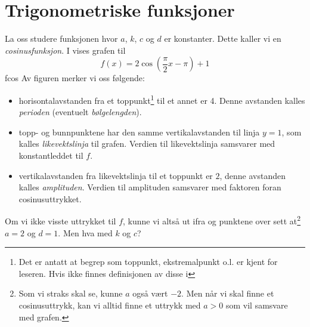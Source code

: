 \kvad
{}

\section{Trigonometriske funksjoner \label{trifunksjoner}}
La oss studere funksjonen
hvor $ a $, $ k $, $ c $ og $ d $ er konstanter. Dette kaller vi en \textit{cosinusfunksjon}. I  vises grafen til
\[ f(x)= 2\cos\left(\frac{\pi}{2}x-\pi \right)+1  \]
{fcos} 
Av figuren merker vi oss følgende:
\begin{itemize}
	\item horisontalavstanden fra et toppunkt\footnote{Det er antatt at begrep som toppunkt, ekstremalpunkt o.l. er kjent for leseren. Hvis ikke finnes definisjonen av disse i } til et annet er 4. Denne avstanden kalles \textit{perioden} (eventuelt \textit{bølgelengden}).	
	\item topp- og bunnpunktene har den samme vertikalavstanden til linja $ {y=1} $, som kalles  \textit{likevektslinja} til grafen. Verdien til likevektslinja samsvarer med konstantleddet til $ f $.
	\item vertikalavstanden fra likevektslinja til et toppunkt er $ 2 $, denne avstanden kalles \textit{amplituden}. Verdien til amplituden samsvarer med faktoren foran cosinusuttrykket.
\end{itemize}
Om vi ikke visste uttrykket til $ f $, kunne vi altså ut ifra   og punktene over sett at\footnote{Som vi straks skal se, kunne $ a $ også vært $ -2 $. Men når vi skal finne et cosinusuttrykk, kan vi alltid finne et uttrykk med ${ a>0} $ som vil samsvare med grafen.} $ {a=2} $ og $ {d=1} $. Men hva med $ k $ og $ c $? \vsk

